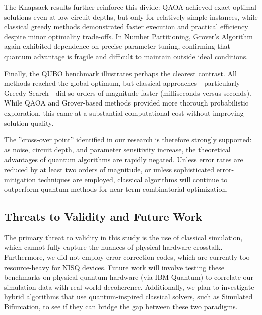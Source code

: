 \documentclass[12pt]{article}
\begin{document}
The Knapsack results further reinforce this divide: QAOA achieved exact optimal solutions even at low circuit depths, but only for relatively simple instances, while classical greedy methods demonstrated faster execution and practical efficiency despite minor optimality trade-offs. In Number Partitioning, Grover’s Algorithm again exhibited dependence on precise parameter tuning, confirming that quantum advantage is fragile and difficult to maintain outside ideal conditions.

Finally, the QUBO benchmark illustrates perhaps the clearest contrast. All methods reached the global optimum, but classical approaches—particularly Greedy Search—did so orders of magnitude faster (milliseconds versus seconds). While QAOA and Grover-based methods provided more thorough probabilistic exploration, this came at a substantial computational cost without improving solution quality.

The ”cross-over point” identified in our research is therefore strongly supported: as noise, circuit depth, and parameter sensitivity increase, the theoretical advantages of quantum algorithms are rapidly negated. Unless error rates are reduced by at least two orders of magnitude, or unless sophisticated error-mitigation techniques are employed, classical algorithms will continue to outperform quantum methods for near-term combinatorial optimization.
\subsection{Threats to Validity and Future Work}
The primary threat to validity in this study is the use of classical simulation, which cannot fully capture the nuances of physical hardware crosstalk. Furthermore, we did not employ error-correction codes, which are currently too resource-heavy for NISQ devices. Future work will involve testing these benchmarks on physical quantum hardware (via IBM Quantum) to correlate our simulation data with real-world decoherence. Additionally, we plan to investigate hybrid algorithms that use quantum-inspired classical solvers, such as Simulated Bifurcation, to see if they can bridge the gap between these two paradigms.
\newpage



\end{document}
